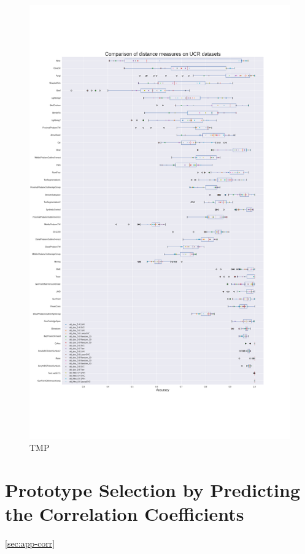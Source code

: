 \begin{figure}[htp]
    \centering
    \includegraphics[width=\textwidth]{img/ucr_accuracy.png}
    \caption{TMP}
\end{figure}


\section{Prototype Selection by Predicting the Correlation Coefficients}
\ref{sec:app-corr}